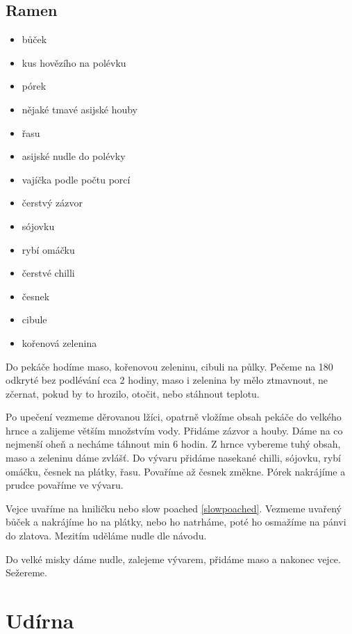 \documentclass[10pt,a4paper]{article}
\newenvironment{myitemize}
{ \begin{itemize}
    \setlength{\itemsep}{0pt}
    \setlength{\parskip}{0pt}
    \setlength{\parsep}{0pt}     }
{ \end{itemize}                  }
\begin{document}
\subsection{Ramen}
\begin{minipage}[t]{0,5\textwidth}
\begin{myitemize} 
\item bůček
\item kus hovězího na polévku
\item pórek
\item nějaké tmavé asijské houby
\item řasu
\item asijské nudle do polévky
\item vajíčka podle počtu porcí
\item čerstvý zázvor
\item sójovku
\item rybí omáčku
\item čerstvé chilli
\item česnek
\item cibule
\item kořenová zelenina
\end{myitemize}
\end{minipage}
\begin{minipage}[t]{0,5\textwidth}
Do pekáče hodíme maso, kořenovou zeleninu, cibuli na půlky. Pečeme na 180 odkryté bez podlévání cca 2 hodiny, maso i zelenina by mělo ztmavnout, ne zčernat, pokud by to hrozilo, otočit, nebo stáhnout teplotu.

Po upečení vezmeme děrovanou lžíci, opatrně vložíme obsah pekáče do velkého hrnce a zalijeme větším množstvím vody. Přidáme zázvor a houby. Dáme na co nejmenší oheň a necháme táhnout min 6 hodin.
Z hrnce vybereme tuhý obsah, maso a zeleninu dáme zvlášť. Do vývaru přidáme nasekané chilli, sójovku, rybí omáčku, česnek na plátky, řasu. Povaříme až česnek změkne. Pórek nakrájíme a prudce povaříme ve vývaru.

Vejce uvaříme na hniličku nebo slow poached \ref{slowpoached}. Vezmeme uvařený bůček a nakrájíme ho na plátky, nebo ho natrháme, poté ho osmažíme na pánvi do zlatova. Mezitím uděláme nudle dle návodu.

Do velké misky dáme nudle, zalejeme vývarem, přidáme maso a nakonec vejce. Sežereme.
\end{minipage}


\pagebreak
\section{Udírna}
\end{document}
